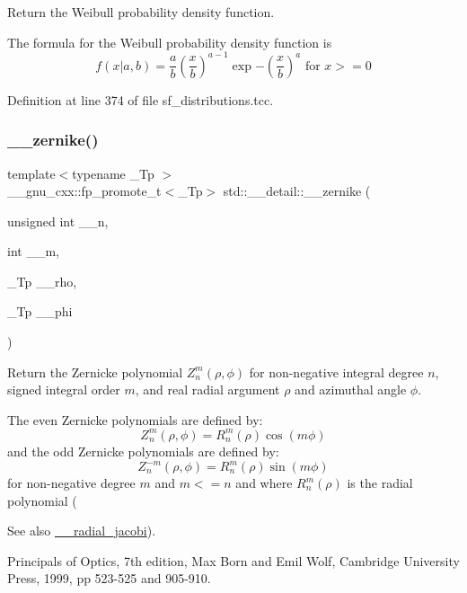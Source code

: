 Return the Weibull probability density function. 

The formula for the Weibull probability density function is \[ f(x | a, b) = \frac{a}{b} \left(\frac{x}{b} \right)^{a-1} \exp{-\left(\frac{x}{b}\right)^a} \mbox{ for } x >= 0 \] 

Definition at line 374 of file sf\+\_\+distributions.\+tcc.

\mbox{\label{namespacestd_1_1____detail_afea4164e87d4290c59c0f8b52113b946}} 
\subsubsection{\texorpdfstring{\+\_\+\+\_\+zernike()}{\_\_zernike()}}
{\footnotesize\ttfamily template$<$typename \+\_\+\+Tp $>$ \\
\+\_\+\+\_\+gnu\+\_\+cxx\+::fp\+\_\+promote\+\_\+t$<$\+\_\+\+Tp$>$ std\+::\+\_\+\+\_\+detail\+::\+\_\+\+\_\+zernike (\begin{DoxyParamCaption}\item[{unsigned int}]{\+\_\+\+\_\+n,  }\item[{int}]{\+\_\+\+\_\+m,  }\item[{\+\_\+\+Tp}]{\+\_\+\+\_\+rho,  }\item[{\+\_\+\+Tp}]{\+\_\+\+\_\+phi }\end{DoxyParamCaption})}

Return the Zernicke polynomial $ Z_n^m(\rho,\phi) $ for non-\/negative integral degree $ n $, signed integral order $ m $, and real radial argument $ \rho $ and azimuthal angle $ \phi $.

The even Zernicke polynomials are defined by\+: \[ Z_n^m(\rho,\phi) = R_n^m(\rho)\cos(m\phi) \] and the odd Zernicke polynomials are defined by\+: \[ Z_n^{-m}(\rho,\phi) = R_n^m(\rho)\sin(m\phi) \] for non-\/negative degree $ m $ and $ m <= n $ and where $ R_n^m(\rho) $ is the radial polynomial (\begin{DoxySeeAlso}{See also}
\hyperlink{namespacestd_1_1____detail_a6d85c9848b491999fc80a1cdbd23db66}{\+\_\+\+\_\+radial\+\_\+jacobi}).

Principals of Optics, 7th edition, Max Born and Emil Wolf, Cambridge University Press, 1999, pp 523-\/525 and 905-\/910.
\end{DoxySeeAlso}

